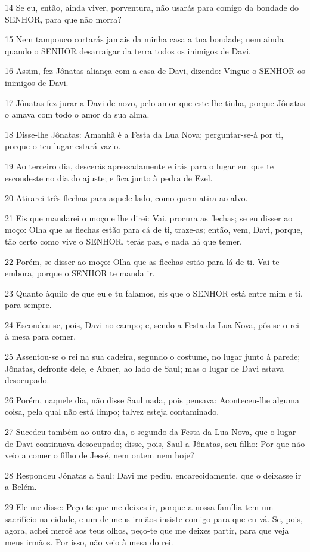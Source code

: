 \par 14 Se eu, então, ainda viver, porventura, não usarás para comigo da bondade do SENHOR, para que não morra?
\par 15 Nem tampouco cortarás jamais da minha casa a tua bondade; nem ainda quando o SENHOR desarraigar da terra todos os inimigos de Davi.
\par 16 Assim, fez Jônatas aliança com a casa de Davi, dizendo: Vingue o SENHOR os inimigos de Davi.
\par 17 Jônatas fez jurar a Davi de novo, pelo amor que este lhe tinha, porque Jônatas o amava com todo o amor da sua alma.
\par 18 Disse-lhe Jônatas: Amanhã é a Festa da Lua Nova; perguntar-se-á por ti, porque o teu lugar estará vazio.
\par 19 Ao terceiro dia, descerás apressadamente e irás para o lugar em que te escondeste no dia do ajuste; e fica junto à pedra de Ezel.
\par 20 Atirarei três flechas para aquele lado, como quem atira ao alvo.
\par 21 Eis que mandarei o moço e lhe direi: Vai, procura as flechas; se eu disser ao moço: Olha que as flechas estão para cá de ti, traze-as; então, vem, Davi, porque, tão certo como vive o SENHOR, terás paz, e nada há que temer.
\par 22 Porém, se disser ao moço: Olha que as flechas estão para lá de ti. Vai-te embora, porque o SENHOR te manda ir.
\par 23 Quanto àquilo de que eu e tu falamos, eis que o SENHOR está entre mim e ti, para sempre.
\par 24 Escondeu-se, pois, Davi no campo; e, sendo a Festa da Lua Nova, pôs-se o rei à mesa para comer.
\par 25 Assentou-se o rei na sua cadeira, segundo o costume, no lugar junto à parede; Jônatas, defronte dele, e Abner, ao lado de Saul; mas o lugar de Davi estava desocupado.
\par 26 Porém, naquele dia, não disse Saul nada, pois pensava: Aconteceu-lhe alguma coisa, pela qual não está limpo; talvez esteja contaminado.
\par 27 Sucedeu também ao outro dia, o segundo da Festa da Lua Nova, que o lugar de Davi continuava desocupado; disse, pois, Saul a Jônatas, seu filho: Por que não veio a comer o filho de Jessé, nem ontem nem hoje?
\par 28 Respondeu Jônatas a Saul: Davi me pediu, encarecidamente, que o deixasse ir a Belém.
\par 29 Ele me disse: Peço-te que me deixes ir, porque a nossa família tem um sacrifício na cidade, e um de meus irmãos insiste comigo para que eu vá. Se, pois, agora, achei mercê aos teus olhos, peço-te que me deixes partir, para que veja meus irmãos. Por isso, não veio à mesa do rei.
